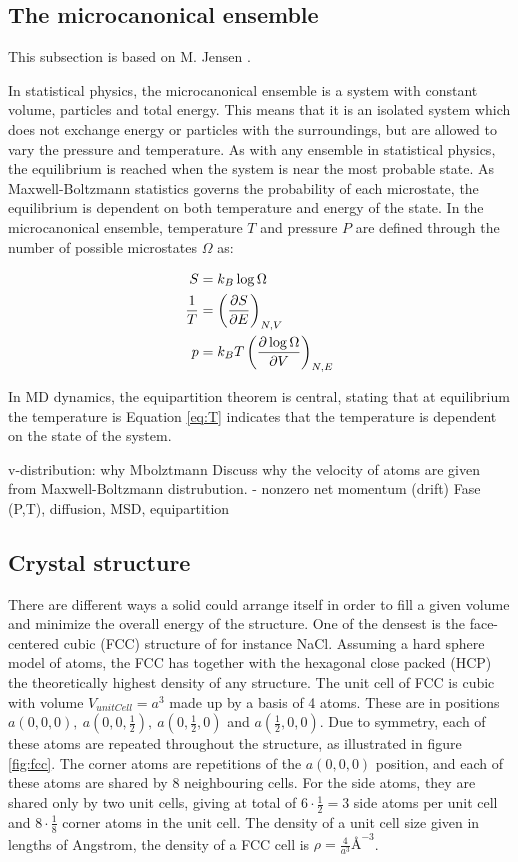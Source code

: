 

\subsection{The microcanonical ensemble}
This subsection is based on M. Jensen \cite{Jensen}. 

In statistical physics, the microcanonical ensemble is a system with constant volume, particles and total energy. This means that it is an isolated system which does not exchange energy or particles  with the surroundings, but are allowed to vary the pressure and temperature. As with any ensemble in statistical physics, the equilibrium is reached when the system is near the most probable state. As Maxwell-Boltzmann statistics governs the probability of each microstate, the equilibrium is dependent on both temperature and energy of the state. In the microcanonical ensemble, temperature $ T $ and pressure $ P $ are defined through the number of possible microstates $ \Omega $ as:

\begin{align}
S &= k_B\log \Omega\\
\frac{1}{T} &= \left(  	\pdv{S}{E}	\right)_{N,V} \label{eq:T}\\
p &= k_BT \left(	\pdv{\log\Omega	}{V}	\right)_{N,E} \label{eq:P}
\end{align}

In MD dynamics, the equipartition theorem is central, stating that at equilibrium the temperature is 
Equation \ref{eq:T} indicates that the temperature is dependent on the  state of the system. 


v-distribution: why Mbolztmann
Discuss why the velocity of atoms are given from Maxwell-Boltzmann distrubution.  - nonzero net momentum (drift)
Fase (P,T), diffusion, MSD,
equipartition




\subsection{Crystal structure}

There are different ways a solid could arrange itself in order to fill a given volume and minimize the overall energy of the structure. One of the densest is the face-centered cubic (FCC) structure of for instance NaCl. Assuming a hard sphere model of atoms, the FCC has together with the hexagonal close packed (HCP) the theoretically highest density of any structure. The unit cell of FCC is cubic with volume $ V_{unitCell} = a^3 $ made up by a basis of 4 atoms. These are in positions $ a(0,0,0), \ a(0,0,\frac{1}{2}),\ a(0,\frac{1}{2}, 0)   $ and $ a(\frac{1}{2}, 0,0) $. Due to symmetry, each of these atoms are repeated throughout the structure, as illustrated in figure \ref{fig:fcc}. The corner atoms are  repetitions of the $ a(0,0,0)$ position, and each of these atoms are shared by 8 neighbouring cells. For the side atoms, they are shared only by two unit cells, giving at total of $ 6\cdot \frac{1}{2}=3 $ side atoms per unit cell and $ 8\cdot  \frac{1}{8}$ corner atoms in the unit cell. The density of a unit cell size given in lengths of Angstrom, the density of a FCC cell  is $\rho=  \frac{4}{a^3} \text{\AA}^{-3}$. 

